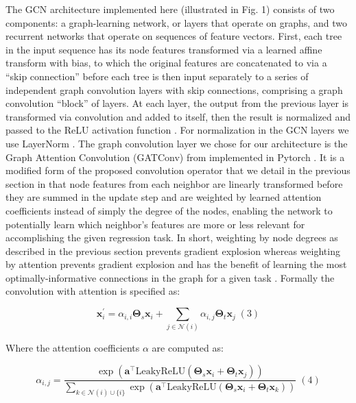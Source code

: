 The GCN architecture implemented here (illustrated in Fig. 1) consists of two components: a graph-learning network, or layers that operate on graphs, and two recurrent networks that operate on sequences of feature vectors. First, each tree in the input sequence has its node features transformed via a learned affine transform with bias, to which the original features are concatenated to via a “skip connection” before each tree is then input separately to a series of independent graph convolution layers with skip connections, comprising a graph convolution “block” of layers. At each layer, the output from the previous layer is transformed via convolution and added to itself, then the result is normalized and passed to the ReLU activation function \cite{agarapDeepLearningUsing2018}. For normalization in the GCN layers we use LayerNorm \cite{baLayerNormalization2016}. The graph convolution layer we chose for our architecture is the Graph Attention Convolution (GATConv) from \cite{brodyHowAttentiveAre2022} implemented in Pytorch \cite{paszkePyTorchImperativeStyle2019}. It is a modified form of the proposed convolution operator that we detail in the previous section in that node features from each neighbor are linearly transformed before they are summed in the update step and are weighted by learned attention coefficients instead of simply the degree of the nodes, enabling the network to potentially learn which neighbor's features are more or less relevant for accomplishing the given regression task. In short, weighting by node degrees as described in the previous section prevents gradient explosion whereas weighting by attention prevents gradient explosion and has the benefit of learning the most optimally-informative connections in the graph for a given task \cite{brodyHowAttentiveAre2022}. Formally the convolution with attention is specified as: 

$$\mathbf{x}^{\prime}_i = \alpha_{i,i}\mathbf{\Theta}_{s}\mathbf{x}_{i} + \sum_{j \in \mathcal{N}(i)} \alpha_{i,j}\mathbf{\Theta}_{t}\mathbf{x}_{j} \;(3)$$

Where the attention coefficients $\alpha$ are computed as:

$$\alpha_{i,j} = \frac{\exp\left(\mathbf{a}^{\top}\mathrm{LeakyReLU}\left(\mathbf{\Theta}_{s} \mathbf{x}_i + \mathbf{\Theta}_{t} \mathbf{x}_j\right)\right)}{\sum_{k \in \mathcal{N}(i) \cup \{ i \}}\exp\left(\mathbf{a}^{\top}\mathrm{LeakyReLU}\left(\mathbf{\Theta}_{s} \mathbf{x}_i + \mathbf{\Theta}_{t} \mathbf{x}_k \right)\right)} \;(4)$$

